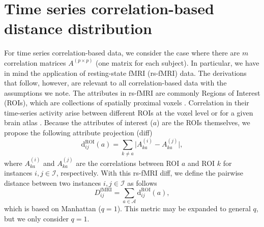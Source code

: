 \documentclass[aos]{imsart}
\begin{document}
\section{Time series correlation-based distance distribution}\label{sec:rs-fMRI_distances}

For time series correlation-based data, we consider the case where there are $m$ correlation matrices $A^{(p \times p)}$ (one matrix for each subject). In particular, we have in mind the application of resting-state fMRI (rs-fMRI) data. The derivations that follow, however, are relevant to all correlation-based data with the assumptions we note. The attributes in rs-fMRI are commonly Regions of Interest (ROIs), which are collections of spatially proximal voxels \cite{lee2013}. Correlation in their time-series activity arise between different ROIs at the voxel level or for a given brain atlas \cite{dickie2017}. Because the attributes of interest ($a$) are the ROIs themselves, we propose the following attribute projection (diff)
%
\begin{equation}\label{eq:diff_rs-fMRI}
\text{d}^\text{ROI}_{ij}(a) = \sum_{k \neq a}\bigl|A^{(i)}_{ka} - A^{(j)}_{ka}\bigr|,
\end{equation}
%
where $A^{(i)}_{ka}$ and $A^{(j)}_{ka}$ are the correlations between ROI $a$ and ROI $k$ for instances $i,j \in \mathcal{I}$, respectively. With this rs-fMRI diff, we define the pairwise distance between two instances $i,j \in \mathcal{I}$ as follows
%
\begin{equation}\label{eq:D_rs-fMRI}
D^\text{fMRI}_{ij} = \sum_{a \in \mathcal{A}} \text{d}^\text{ROI}_{ij}(a),
\end{equation}
%
which is based on Manhattan ($q=1$). This metric may be expanded to general $q$, but we only consider $q=1$.
\end{document}
